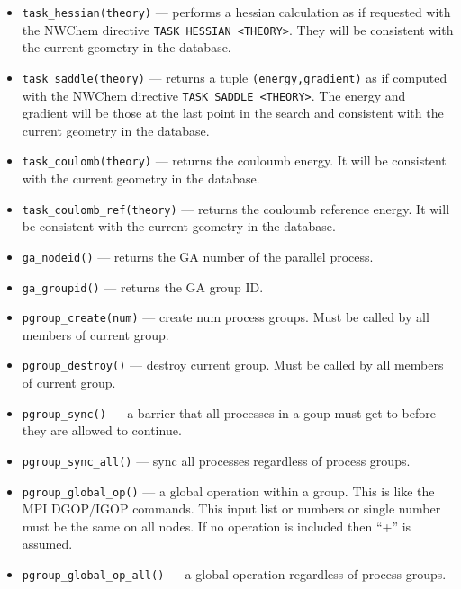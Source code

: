 \begin{itemize}
\item \verb+task_hessian(theory)+ --- performs a hessian calculation
as if requested with the NWChem
directive \verb+TASK HESSIAN <THEORY>+.  They will be consistent
with the current geometry in the database.

\item \verb+task_saddle(theory)+ --- returns a tuple
\verb+(energy,gradient)+ as if computed with the NWChem
directive \verb+TASK SADDLE <THEORY>+.  The energy and gradient
will be those at the last point in the search and consistent
with the current geometry in the database.

\item \verb+task_coulomb(theory)+ --- returns the
couloumb energy.
It will be consistent with the current geometry in the database.

\item \verb+task_coulomb_ref(theory)+ --- returns the
couloumb reference energy.
It will be consistent with the current geometry in the database.

\item \verb+ga_nodeid()+ --- returns the GA number of the parallel
process.

\item \verb+ga_groupid()+ --- returns the GA group ID.



\item \verb+pgroup_create(num)+ --- create num process groups.  Must be called by all members of current group.

\item \verb+pgroup_destroy()+ --- destroy current group.  Must be called by all members of current group.


\item \verb+pgroup_sync()+ --- a barrier that all processes in a goup must get to before they are allowed to continue.

\item \verb+pgroup_sync_all()+ --- sync all processes regardless of process groups.


\item \verb+pgroup_global_op()+ --- a global operation within a group.
 This is like the MPI DGOP/IGOP commands.
 This input list or numbers or single number must be the same on all nodes.
 If no operation is included then ``+''  is assumed.

\item \verb+pgroup_global_op_all()+ --- a global operation regardless of process groups.


\end{itemize}
